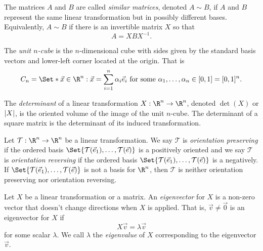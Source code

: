 \begin{SaveDefinition}[key=SimilarMatrices, title={Similar Matrices}]
	The matrices $A$ and $B$ are called
	\emph{similar matrices}, denoted $A\sim B$, if $A$ and $B$ represent the
	same linear transformation but in possibly different bases. Equivalently,
	$A\sim B$ if there is an invertible matrix $X$ so that
	\[
		A=XBX^{-1}.
	\]

\end{SaveDefinition}

\begin{SaveDefinition}[key=Unitncube, title={Unit $n$-cube}]
	The
	\emph{unit $n$-cube} is the $n$-dimensional cube with sides given by the
	standard basis vectors and lower-left corner located at the origin. That
	is
	\[
		C_{n}=\Set*{\vec x\in\R^n:\vec x=\sum_{i=1}^n\alpha_i\vec e_i\text{
		for some }\alpha_1,\ldots,\alpha_n\in[0,1]}=[0,1]^{n}.
	\]

\end{SaveDefinition}

\begin{SaveDefinition}[key=Determinant, title={Determinant}]
	The
	\emph{determinant} of a linear transformation $X:\R^{n}\to \R^{n}$, denoted $\det(X)$ or $\lvert X\rvert$, is
	the oriented volume of the image of the unit $n$-cube. The determinant of
	a square matrix is the determinant of its induced transformation.
\end{SaveDefinition}

\begin{SaveDefinition}[key=OrientationPreservingLinearTransformation, title={Orientation Preserving Linear Transformation}]
	Let $\mathcal T:\R^n\to\R^n$ be a linear transformation. We say $\mathcal T$
	is \emph{orientation preserving} if the ordered basis $\Set{\mathcal T(\vec e_1),\ldots, \mathcal T(\vec e)}$
	is a positively oriented  and we say $\mathcal T$
	is \emph{orientation reversing} if the ordered basis $\Set{\mathcal T(\vec e_1),\ldots, \mathcal T(\vec e)}$
	is a negatively. If $\Set{\mathcal T(\vec e_1),\ldots, \mathcal T(\vec e)}$
	is not a basis for $\R^n$, then $\mathcal T$ is neither orientation preserving nor orientation reversing.
\end{SaveDefinition}

\begin{SaveDefinition}[key=Eigenvector, title={Eigenvector}]
	Let $X$ be a linear transformation or a matrix. An
	\emph{eigenvector} for $X$ is a non-zero vector that doesn't change
	directions when $X$ is applied. That is, $\vec v\neq \vec 0$ is an
	eigenvector for $X$ if
	\[
		X\vec v=\lambda \vec v
	\]
	 for some scalar $\lambda$. We call $\lambda$ the
	\emph{eigenvalue} of $X$ corresponding to the eigenvector $\vec v$.
\end{SaveDefinition}

